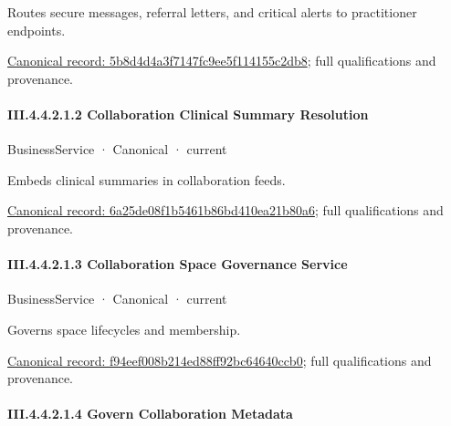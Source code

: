 Routes secure messages, referral letters, and critical alerts to practitioner endpoints.


{\footnotesize \href{../../../../../../../../continuum/business/business-function/5b8d4d4a3f7147fc9ee5f114155c2db8.md}{Canonical record: 5b8d4d4a3f7147fc9ee5f114155c2db8}; full qualifications and provenance.}\par
\paragraph*{III.4.4.2.1.2 Collaboration Clinical Summary Resolution}
\label{navigation:III.4.4.2.1.2}

\label{element:6a25de08f1b5461b86bd410ea21b80a6}
{\small BusinessService · Canonical · current}\par

Embeds clinical summaries in collaboration feeds.


{\footnotesize \href{../../../../../../../../continuum/business/business-service/6a25de08f1b5461b86bd410ea21b80a6.md}{Canonical record: 6a25de08f1b5461b86bd410ea21b80a6}; full qualifications and provenance.}\par
\paragraph*{III.4.4.2.1.3 Collaboration Space Governance Service}
\label{navigation:III.4.4.2.1.3}

\label{element:f94eef008b214ed88ff92bc64640ccb0}
{\small BusinessService · Canonical · current}\par

Governs space lifecycles and membership.


{\footnotesize \href{../../../../../../../../continuum/business/business-service/f94eef008b214ed88ff92bc64640ccb0.md}{Canonical record: f94eef008b214ed88ff92bc64640ccb0}; full qualifications and provenance.}\par
\paragraph*{III.4.4.2.1.4 Govern Collaboration Metadata}
\label{navigation:III.4.4.2.1.4}

